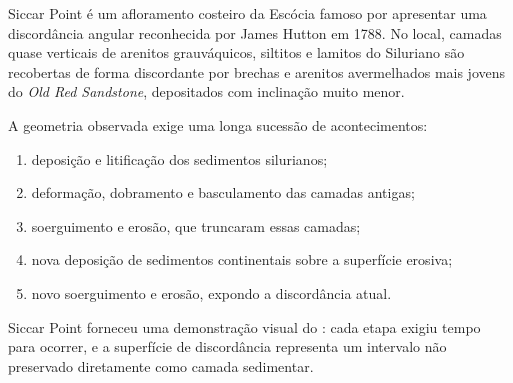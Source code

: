\begin{verbete}{Siccar Point}
 é um afloramento costeiro da Escócia famoso por apresentar uma discordância angular reconhecida por James Hutton em 1788. No local, camadas quase verticais de arenitos grauváquicos, siltitos e lamitos do Siluriano são recobertas de forma discordante por brechas e arenitos avermelhados mais jovens do \textit{Old Red Sandstone}, depositados com inclinação muito menor.

A geometria observada exige uma longa sucessão de acontecimentos:

\begin{enumerate}
  \item deposição e litificação dos sedimentos silurianos;
  \item deformação, dobramento e basculamento das camadas antigas;
  \item soerguimento e erosão, que truncaram essas camadas;
  \item nova deposição de sedimentos continentais sobre a superfície erosiva;
  \item novo soerguimento e erosão, expondo a discordância atual.
\end{enumerate}

\begin{center}
\end{center}

Siccar Point forneceu uma demonstração visual do : cada etapa exigiu tempo para ocorrer, e a superfície de discordância representa um intervalo não preservado diretamente como camada sedimentar.


\end{verbete}


